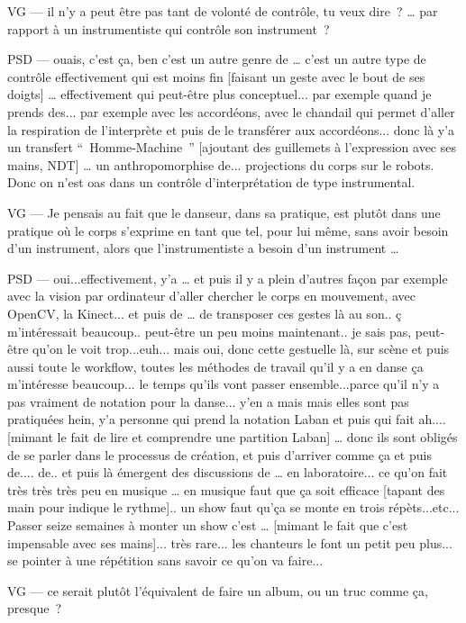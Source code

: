 VG — il n'y a peut être pas tant de volonté de contrôle, tu veux dire ? … par rapport à un instrumentiste qui contrôle son instrument ? 

PSD — ouais, c'est ça, ben c'est un autre genre de … c'est un autre type de contrôle effectivement qui est moins fin [faisant un geste avec le bout de ses doigts] … effectivement qui peut-être plus conceptuel... par exemple quand je prends des... par exemple avec les accordéons, avec le chandail qui permet d'aller la respiration de l'interprète et puis de le transférer aux accordéons... donc là y'a un transfert “ Homme-Machine ” [ajoutant des guillemets à l'expression avec ses mains, NDT] … un anthropomorphise de... projections du corps sur le robots. Donc on n'est oas dans un contrôle d'interprétation de type instrumental. 

VG — Je pensais au fait que le danseur, dans sa pratique, est plutôt dans une pratique où le corps s'exprime en tant que tel, pour lui même, sans avoir besoin d'un instrument, alors que l'instrumentiste a besoin d'un instrument … 

PSD — oui...effectivement, y'a … et puis il y a plein d'autres façon par exemple avec la vision par ordinateur d'aller chercher le corps en mouvement, avec OpenCV, la Kinect... et puis de … de transposer ces gestes là au son.. ç m'intéressait beaucoup.. peut-être un peu moins maintenant.. je sais pas, peut-être qu'on le voit trop...euh... mais oui, donc cette gestuelle là, sur scène et puis aussi toute le workflow, toutes les méthodes de travail qu'il y a en danse ça m'intéresse beaucoup... le temps qu'ils vont passer ensemble...parce qu'il n'y a pas vraiment de notation pour la danse... y'en a mais mais elles sont pas pratiquées hein, y'a personne qui prend la notation Laban et puis qui fait ah.... [mimant le fait de lire et comprendre une partition Laban] … donc ils sont obligés de se parler dans le processus de création, et puis d'arriver comme ça et puis de.... de.. et puis là émergent des discussions de … en laboratoire... ce qu'on fait très très très peu en musique … en musique faut que ça soit efficace [tapant des main pour indique le rythme].. un show faut qu'ça se monte en trois répèts...etc... Passer seize semaines à monter un show c'est … [mimant le fait que c'est impensable avec ses mains]... très rare... les chanteurs le font un petit peu plus... se pointer à une répétition sans savoir ce qu'on va faire...  

VG — ce serait plutôt l'équivalent de faire un album, ou un truc comme ça, presque ? 

